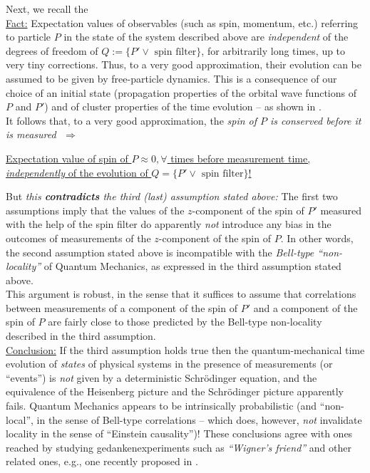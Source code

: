 \documentclass[a4paper,11pt]{article}
\begin{document}
Next, we recall the\\
\underline{Fact:}
Expectation values of observables (such as spin, momentum, etc.) referring to particle $P$ in the state of the system described above are \textit{independent} of the degrees of freedom of 
$Q:= \lbrace P'\vee \text{ spin filter}\rbrace$, for arbitrarily long times, up to very tiny corrections. Thus, to a very good approximation, their evolution can be assumed to be given by free-particle dynamics. This is a consequence of our choice of an initial state (propagation properties of the orbital wave functions of $P$ and $P'$) and of cluster properties of the time evolution -- as shown in \cite{FFS}. \\
It follows that, to a very good approximation, the \textit{spin of $P$ is \textit{conserved} before it is measured} \,\,$\Rightarrow$
\begin{center}
\underline{Expectation value of spin of $P \approx 0, \forall$ times before measurement time,}
\underline{\textit{independently} of the evolution of $Q= \lbrace P' \vee \text{  spin filter}\rbrace$!}
\end{center}

But \textit{this {\bf{contradicts}} the third (last) assumption stated above:} The first two assumptions imply that the values of the $z$-component of the spin of $P'$ measured with the help of the spin filter do apparently \textit{not} introduce any bias in the outcomes of measurements of the $z$-component of the spin of $P$. In other words, the second assumption stated above is incompatible with the \textit{Bell-type ``non-locality''} of Quantum Mechanics, as expressed in the third assumption stated above. \\
This argument is robust, in the sense that it suffices to assume that correlations between measurements of a component of the spin of $P'$ and a component of the spin of $P$ are fairly close to those predicted by the Bell-type non-locality described in the third assumption.\\

\underline{Conclusion:} If the third assumption holds true then the quantum-mechanical time evolution of \textit{states} of physical systems in the presence of measurements (or ``events'') is \textit{not} given by a deterministic Schr\"{o}dinger equation, and the equivalence of the Heisenberg picture and the Schr\"{o}dinger picture apparently fails. Quantum Mechanics appears to be intrinsically probabilistic (and ``non-local'', in the sense of Bell-type correlations -- which does, however, \textit{not} invalidate locality in the sense of ``Einstein causality'')!
These conclusions agree with ones reached by studying gedankenexperiments such as \textit{``Wigner's friend''} and other related ones, e.g., one recently proposed in \cite{Renner}.\\
\end{document}
